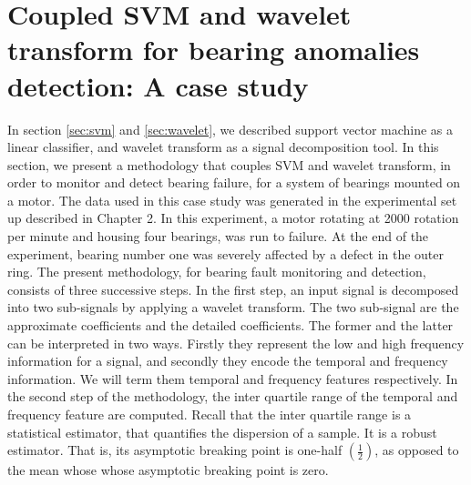 \documentclass[../Main/thesis.tex]{subfiles}
\begin{document}
\section{Coupled SVM and wavelet transform for bearing anomalies detection: A case study}
\label{sec:result-svm-wavelet}
In section \ref{sec:svm} and \ref{sec:wavelet}, we described support vector machine as a linear classifier, and wavelet transform as a signal decomposition tool. In this section, we present a methodology that couples SVM and wavelet transform, in order to monitor and detect bearing failure, for a system of bearings mounted on a motor. The data used in this case study was generated in the experimental set up described in Chapter 2. In this experiment, a motor rotating at 2000 rotation per minute and housing four bearings, was run to failure. At the end of the experiment, bearing number one was severely affected by a defect in the outer ring.
\justify
The present methodology, for bearing fault monitoring and detection, consists of three successive steps. In the first step, an input signal is decomposed into two sub-signals by applying a wavelet transform. The two sub-signal are the approximate coefficients and the detailed coefficients. The former and the latter can be interpreted in two ways. Firstly they represent the low and high frequency information for a signal, and secondly they encode the temporal and frequency information. We will term them temporal and frequency features respectively. 
\justify
In the second step of the methodology, the inter quartile range of the temporal and frequency feature are computed. Recall that the inter quartile range is a statistical estimator, that quantifies the dispersion of a sample. It is a robust estimator. That is, its asymptotic breaking point is one-half $\left(\frac{1}{2}\right)$, as opposed to the mean whose whose asymptotic breaking point is zero.





















\blankpage
\end{document}
